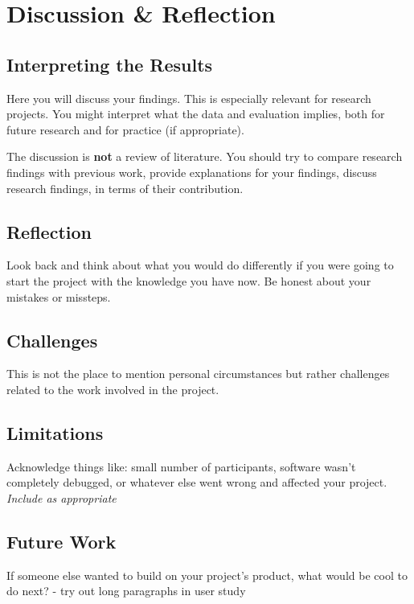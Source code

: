 \section{Discussion \& Reflection}

\subsection{Interpreting the Results}

Here you will discuss your findings. This is especially relevant for research projects. You might 
 interpret what the data and evaluation implies, both for future research and for practice (if appropriate). 
 
 The discussion is \textbf{not} a review of literature. You should try to compare research findings with previous work,
provide  explanations for your findings,
discuss  research findings, in terms of their contribution.


\subsection{Reflection}

Look back and think about what you would do differently if you were going to start the project with the knowledge you have now. Be honest about your mistakes or missteps. 

\subsection{Challenges}
This is not the place to mention personal circumstances but rather challenges related to the work involved in the project.

\subsection{Limitations}
Acknowledge things like: small number of participants, software wasn't completely debugged, or whatever else went wrong and affected your project.
\emph{Include as appropriate}



\subsection{Future Work}
If someone else wanted to build on your project's product, what would be cool to do next?
- try out long paragraphs in user study